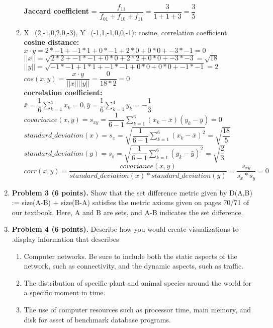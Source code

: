 \documentclass{article}%
\begin{document}
\begin{enumerate}
\begin{enumerate}
				
		\textbf{Jaccard coefficient} = $\dfrac{f_{11}}{f_{01}+f_{10}+f_{11}} = \dfrac{3}{1+1+3} = \dfrac{3}{5}$\\	
		
		\item X=(2,-1,0,2,0,-3), Y=(-1,1,-1,0,0,-1): cosine, correlation coefficient \\
		\textbf{cosine distance:} \\
		$ x \cdot  y = 2*-1+-1*1+0*-1+2*0 + 0*0+-3*-1 = 0$ \\
		$ ||x|| = \sqrt{2*2+-1*-1+0*0 + 2*2 + 0*0 + -3*-3} = \sqrt{18} $ \\
		$ ||y|| = \sqrt{-1*-1 +1*1 +-1*-1 + 0*0 + 0*0 + -1*-1 } = 2 $ \\
		$ cos(x,y) = \dfrac{x \cdot y }{ ||x|| ||y||} = \dfrac{0}{18*2} =0$\\
		
		
		\textbf{correlation coefficient:}\\
		$ \bar{x} = \dfrac{1}{6} \sum_{k=1}^4x_k=0, \bar{y} = \dfrac{1}{6} \sum_{k=1}^4y_k = -\dfrac{1}{3} $ \\
		$ covariance(x,y) = s_{xy} = \dfrac{1}{6 - 1} \sum_{k=1}^{6}(x_k - \bar{x})(y_k-\bar{y}) = 0$	\\
		$ standard\_deviation(x) = s_{x} = \sqrt{\dfrac{1}{6-1}\sum_{k=1}^{6}(x_k - \bar{x})^2} = \sqrt{\dfrac{18}{5}}$	\\		
		$ standard\_deviation(y) = s_{y} = \sqrt{\dfrac{1}{6-1}\sum_{k=1}^{6}(y_k - \bar{y})^2} = \sqrt{\dfrac{2}{3}}$	\\		
		$ corr(x,y) = \dfrac{covariance(x,y)}{standard\_deviation(x)*standard\_deviation(y)} = \dfrac{s_{xy}}{s_x*s_y} = 0$	 \\	
	
		
 \end{enumerate}
 
 \item\textbf{Problem 3 (6 points). } Show that the set difference metric given by D(A,B) := size(A-B) + size(B-A) satisfies the metric axioms given on pages 70/71 of our textbook. Here, A and B are sets, and A-B indicates the set difference.


\item \textbf{Problem 4 (6 points).} Describe how you would create visualizations to .display information that describes
 \begin{enumerate}
		\item Computer networks. Be sure to include both the static aspects of the network, such as connectivity, and the dynamic aspects, such as traffic.
		\item The distribution of specific plant and animal species around the world for a specific moment in time.
		\item The use of computer resources such as processor time, main memory, and disk for asset of benchmark database programs.
 \end{enumerate}
 

\end{enumerate}
\end{document}
